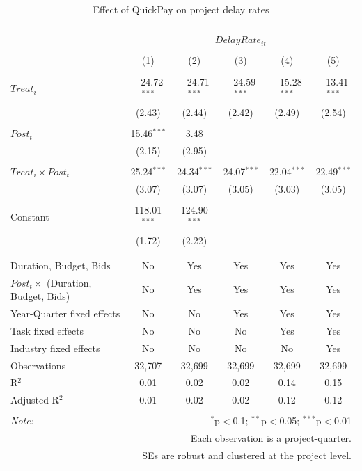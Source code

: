 \documentclass[
]{article}
\begin{document}
\begin{table}[H] \centering 
  \caption{Effect of QuickPay on project delay rates} 
  \label{} 
\small 
\begin{tabular}{@{\extracolsep{-2pt}}lccccc} 
\\[-1.8ex]\hline 
\hline \\[-1.8ex] 
\\[-1.8ex] & \multicolumn{5}{c}{$DelayRate_{it}$} \\ 
\\[-1.8ex] & (1) & (2) & (3) & (4) & (5)\\ 
\hline \\[-1.8ex] 
 $Treat_i$ & $-$24.72$^{***}$ & $-$24.71$^{***}$ & $-$24.59$^{***}$ & $-$15.28$^{***}$ & $-$13.41$^{***}$ \\ 
  & (2.43) & (2.44) & (2.42) & (2.49) & (2.54) \\ 
  & & & & & \\ 
 $Post_t$ & 15.46$^{***}$ & 3.48 &  &  &  \\ 
  & (2.15) & (2.95) &  &  &  \\ 
  & & & & & \\ 
 $Treat_i \times Post_t$ & 25.24$^{***}$ & 24.34$^{***}$ & 24.07$^{***}$ & 22.04$^{***}$ & 22.49$^{***}$ \\ 
  & (3.07) & (3.07) & (3.05) & (3.03) & (3.05) \\ 
  & & & & & \\ 
 Constant & 118.01$^{***}$ & 124.90$^{***}$ &  &  &  \\ 
  & (1.72) & (2.22) &  &  &  \\ 
  & & & & & \\ 
\hline \\[-1.8ex] 
Duration, Budget, Bids & No & Yes & Yes & Yes & Yes \\ 
$Post_t \times$  (Duration, Budget, Bids) & No & Yes & Yes & Yes & Yes \\ 
Year-Quarter fixed effects & No & No & Yes & Yes & Yes \\ 
Task fixed effects & No & No & No & Yes & Yes \\ 
Industry fixed effects & No & No & No & No & Yes \\ 
Observations & 32,707 & 32,699 & 32,699 & 32,699 & 32,699 \\ 
R$^{2}$ & 0.01 & 0.02 & 0.02 & 0.14 & 0.15 \\ 
Adjusted R$^{2}$ & 0.01 & 0.02 & 0.02 & 0.12 & 0.12 \\ 
\hline 
\hline \\[-1.8ex] 
\textit{Note:}  & \multicolumn{5}{r}{$^{*}$p$<$0.1; $^{**}$p$<$0.05; $^{***}$p$<$0.01} \\ 
 & \multicolumn{5}{r}{Each observation is a project-quarter.} \\ 
 & \multicolumn{5}{r}{SEs are robust and clustered at the project level.} \\ 
\end{tabular} 
\end{table}
\end{document}
